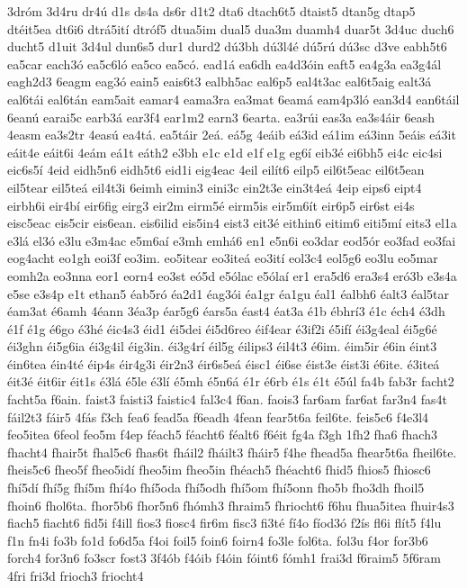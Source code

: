 {3dróm
3d4ru
dr4ú
d1s
ds4a
ds6r
d1t2
dta6
dtach6t5
dtaist5
dtan5g
dtap5
dtéit5ea
dt6i6
dtrá5ití
dtróf5
dtua5im
dual5
dua3m
duamh4
duar5t
3d4uc
duch6
ducht5
d1uit
3d4ul
dun6s5
dur1
durd2
dú3bh
dú3l4é
dú5rú
dú3sc
d3ve
eabh5t6
ea5car
each3ó
ea5c6ló
ea5co
ea5có.
ead1á
ea6dh
ea4d3óin
eaft5
ea4g3a
ea3g4ál
eagh2d3
6eagm
eag3ó
eain5
eais6t3
ealbh5ac
eal6p5
eal4t3ac
eal6t5aig
ealt3á
eal6tái
eal6tán
eam5ait
eamar4
eama3ra
ea3mat
6eamá
eam4p3ló
ean3d4
ean6táil
6eanú
earai5c
earb3á
ear3f4
ear1m2
earn3
6earta.
ea3rúi
eas3a
ea3s4áir
6eash
4easm
ea3s2tr
4easú
ea4tá.
ea5táir
2eá.
eá5g
4eáib
eá3id
eá1im
eá3inn
5eáis
eá3it
eáit4e
eáit6i
4eám
eá1t
eáth2
e3bh
e1c
e1d
e1f
e1g
eg6í
eib3é
ei6bh5
ei4c
eic4si
eic6s5í
4eid
eidh5n6
eidh5t6
eid1i
eig4eac
4eil
eilít6
eilp5
eil6t5eac
eil6t5ean
eil5tear
eil5teá
eil4t3i
6eimh
eimin3
eini3c
ein2t3e
ein3t4eá
4eip
eips6
eipt4
eirbh6i
eir4bí
eir6fig
eirg3
eir2m
eirm5é
eirm5is
eir5m6ít
eir6p5
eir6st
ei4s
eisc5eac
eis5cir
eis6ean.
eis6ilid
eis5in4
eist3
eit3é
eithin6
eitim6
eiti5mí
eits3
el1a
e3lá
el3ó
e3lu
e3m4ac
e5m6aí
e3mh
emhá6
en1
e5n6i
eo3dar
eod5ór
eo3fad
eo3fai
eog4acht
eo1gh
eoi3f
eo3im.
eo5itear
eo3iteá
eo3ití
eol3c4
eol5g6
eo3lu
eo5mar
eomh2a
eo3nna
eor1
eorn4
eo3st
eó5d
e5ólac
e5ólaí
er1
era5d6
era3s4
eró3b
e3s4a
e5se
e3s4p
e1t
ethan5
éab5ró
éa2d1
éag3ói
éa1gr
éa1gu
éal1
éalbh6
éalt3
éal5tar
éam3at
é6amh
4éann
3éa3p
éar5g6
éars5a
éast4
éat3a
é1b
ébhrí3
é1c
éch4
é3dh
é1f
é1g
é6go
é3hé
éic4s3
éid1
éi5dei
éi5d6reo
éif4ear
é3if2i
é5ifí
éi3g4eal
éi5g6é
éi3ghn
éi5g6ia
éi3g4il
éig3in.
éi3g4rí
éil5g
éilips3
éil4t3
é6im.
éim5ir
é6in
éint3
éin6tea
éin4té
éip4s
éir4g3i
éir2n3
éir6s5eá
éisc1
éi6se
éist3e
éist3i
é6ite.
é3iteá
éit3é
éit6ir
éit1s
é3lá
é5le
é3lí
é5mh
é5n6á
é1r
é6rb
é1s
é1t
é5úl
fa4b
fab3r
facht2
facht5a
f6ain.
faist3
faisti3
faistic4
fal3c4
f6an.
faois3
far6am
far6at
far3n4
fas4t
fáil2t3
fáir5
4fás
f3ch
fea6
fead5a
f6eadh
4fean
fear5t6a
feil6te.
feis5c6
f4e3l4
feo5itea
6feol
feo5m
f4ep
féach5
féacht6
féalt6
f6éit
fg4a
f3gh
1fh2
fha6
fhach3
fhacht4
fhair5t
fhal5c6
fhas6t
fháil2
fháilt3
fháir5
f4he
fhead5a
fhear5t6a
fheil6te.
fheis5c6
fheo5f
fheo5idí
fheo5im
fheo5in
fhéach5
fhéacht6
fhid5
fhios5
fhiosc6
fhí5dí
fhí5g
fhí5m
fhí4o
fhí5oda
fhí5odh
fhí5om
fhí5onn
fho5b
fho3dh
fhoil5
fhoin6
fhol6ta.
fhor5b6
fhor5n6
fhómh3
fhraim5
fhriocht6
f6hu
fhua5itea
fhuir4s3
fiach5
fiacht6
fid5i
f4ill
fios3
fiosc4
fir6m
fisc3
fi3té
fí4o
fíod3ó
f2ís
fl6i
flít5
f4lu
f1n
fn4i
fo3b
fo1d
fo6d5a
f4oi
foil5
foin6
foirn4
fo3le
fol6ta.
fol3u
f4or
for3b6
forch4
for3n6
fo3scr
fost3
3f4ób
f4óib
f4óin
fóint6
fómh1
frai3d
f6raim5
5f6ram
4fri
fri3d
frioch3
friocht4
}
